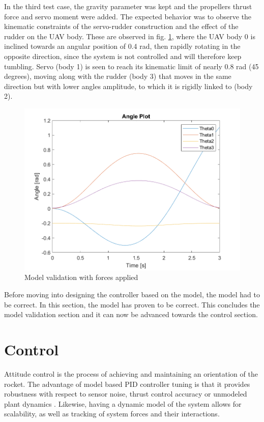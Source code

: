In the third test case, the gravity parameter was kept and the propellers thrust force and servo moment were added. The expected behavior was to observe the kinematic constraints of the servo-rudder construction and the effect of the rudder on the UAV body. These are observed in fig. \ref{fig:Model validation with forces applied}, where the UAV body 0 is inclined towards an angular position of 0.4 rad, then rapidly rotating in the opposite direction, since the system is not controlled and will therefore keep tumbling. Servo (body 1) is seen to reach its kinematic limit of nearly 0.8 rad (45 degrees), moving along with the rudder (body 3) that moves in the same direction but with lower angles amplitude, to which it is rigidly linked to (body 2). 


\begin{figure}[H]
  \centering
  \includegraphics[scale=0.8]{graphics/Integration/thetas.png}
  \caption{Model validation with forces applied}
  \label{fig:Model validation with forces applied}
\end{figure}

Before moving into designing the controller based on the model, the model had to be correct. In this section, the model has proven to be correct. This concludes the model validation section and it can now be advanced towards the control section. 


\section{Control}

Attitude control is the process of achieving and maintaining an orientation of the rocket. 
The advantage of model based PID controller tuning is that it provides robustness with respect to sensor noise, thrust control accuracy or unmodeled plant dynamics \cite{1273571} . Likewise, having a dynamic model of the system allows for scalability, as well as tracking of system forces and their interactions. 


